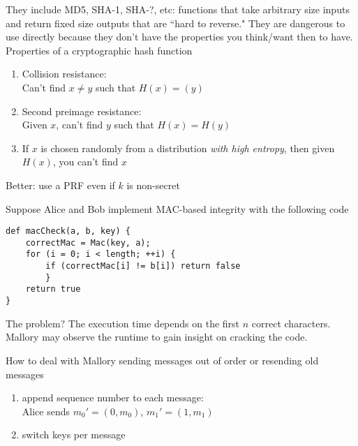They include MD5, SHA-1, SHA-?, etc: functions that take arbitrary size inputs and return
fixed size outputs that are ``hard to reverse." They are dangerous to use directly because
they don't have the properties you think/want then to have.\\

Properties of a cryptographic hash function
\begin{enumerate}
	\item Collision resistance:\\
		Can't find $x \neq y$ such that $H(x) = (y)$
	\item Second preimage resistance:\\
		Given $x$, can't find $y$ such that $H(x) = H(y)$
	\item If $x$ is chosen randomly from a distribution \textit{with high entropy},
	then given $H(x)$, you can't find $x$
\end{enumerate}

Better: use a PRF even if $k$ is non-secret

Suppose Alice and Bob implement MAC-based integrity with the following code

\begin{verbatim}
def macCheck(a, b, key) {
    correctMac = Mac(key, a);
    for (i = 0; i < length; ++i) {
        if (correctMac[i] != b[i]) return false
        }
    return true
}
\end{verbatim}

The problem? The execution time depends on the first $n$ correct characters. Mallory may observe the runtime to
gain insight on cracking the code.

How to deal with Mallory sending messages out of order or resending old messages
\begin{enumerate}
\item append sequence number to each message:\\
        Alice sends $m_0' = (0, m_0)$, $m_1' = (1, m_1)$
\item switch keys per message
\end{enumerate}
